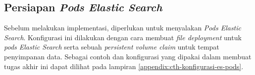 \subsection{Persiapan \textit{Pods Elastic Search}}

Sebelum melakukan implementasi, diperlukan untuk menyalakan \textit{Pods Elastic Search}. Konfigurasi ini dilakukan dengan cara membuat \textit{file deployment} untuk \textit{pods Elastic Search} serta sebuah \textit{persistent volume claim} untuk tempat penyimpanan data. Sebagai contoh dan konfigurasi yang dipakai dalam membuat tugas akhir ini dapat dilihat pada lampiran \ref{appendix:cth-konfigurasi-es-pods}.


% 



